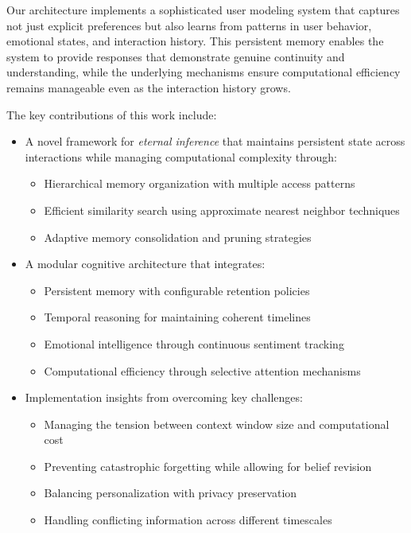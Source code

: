 Our architecture implements a sophisticated user modeling system that captures not just explicit preferences but also learns from patterns in user behavior, emotional states, and interaction history. This persistent memory enables the system to provide responses that demonstrate genuine continuity and understanding, while the underlying mechanisms ensure computational efficiency remains manageable even as the interaction history grows.

The key contributions of this work include:
\begin{itemize}
    \item A novel framework for \emph{eternal inference} that maintains persistent state across interactions while managing computational complexity through:
    \begin{itemize}
        \item Hierarchical memory organization with multiple access patterns
        \item Efficient similarity search using approximate nearest neighbor techniques
        \item Adaptive memory consolidation and pruning strategies
    \end{itemize}
    
    \item A modular cognitive architecture that integrates:
    \begin{itemize}
        \item Persistent memory with configurable retention policies
        \item Temporal reasoning for maintaining coherent timelines
        \item Emotional intelligence through continuous sentiment tracking
        \item Computational efficiency through selective attention mechanisms
    \end{itemize}
    
    \item Implementation insights from overcoming key challenges:
    \begin{itemize}
        \item Managing the tension between context window size and computational cost
        \item Preventing catastrophic forgetting while allowing for belief revision
        \item Balancing personalization with privacy preservation
        \item Handling conflicting information across different timescales
    \end{itemize}
    

\end{itemize}
